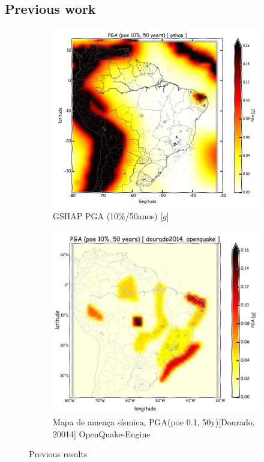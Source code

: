 \documentclass[final]{beamer}
\begin{document}
\begin{poster}
\section{Previous work}


\begin{figure}[H]
  \centering
	\begin{subfigure}[t]{0.49\textwidth}
	  \centering
	  \includegraphics[width=1\textwidth]{pga_gshap} 
	  \caption{GSHAP \gls{PGA} (10\%/50anos) [$g$]}
	  \label{fig:gshap} 
	\end{subfigure}
	\begin{subfigure}[t]{0.49\textwidth}
	  \centering
	  \includegraphics[width=1\textwidth]{pga_dourado_oq} 
	  \caption{Mapa de ameaça sísmica, PGA(poe 0.1, 50y)[Dourado, 20014]
	  OpenQuake-Engine }
	  \label{fig:pga_dourado_oq} 
	\end{subfigure}
  \caption{Previous results}
  \label{fig:prev_results} 
\end{figure}



\end{poster}
\end{document}
